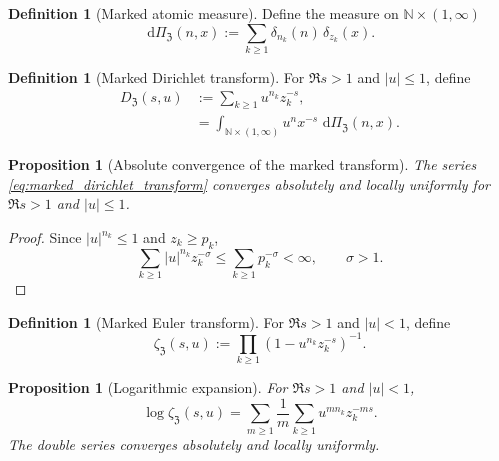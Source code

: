 \documentclass[11pt]{amsart}
\numberwithin{equation}{section}
\theoremstyle{plain}
\newtheorem{proposition}[theorem]{Proposition}
\theoremstyle{definition}
\newtheorem{definition}[theorem]{Definition}
\theoremstyle{remark}
\newcommand{\dd}{\,\mathrm d}
\newcommand{\ZP}{\mathfrak Z}
\newcommand{\N}{\mathbb N}
\begin{document}
\begin{definition}[Marked atomic measure]
\label{def:marked_atomic_measure}
Define the measure on $\N\times(1,\infty)$
\begin{equation}
 \dd\Pi_{\ZP}(n,x)
 :=\sum_{k\geq1}\delta_{n_k}(n)\,\delta_{z_k}(x).
 \label{eq:marked_atomic_measure}
\end{equation}
\end{definition}

\begin{definition}[Marked Dirichlet transform]
\label{def:marked_dirichlet_transform}
For $\Re s>1$ and $|u|\leq1$, define
\begin{align}
 D_{\ZP}(s,u)
 &:=\sum_{k\geq1}u^{n_k}z_k^{-s},
 \label{eq:marked_dirichlet_transform}
 \\
 &=\int_{\N\times(1,\infty)}u^n x^{-s}\,\dd\Pi_{\ZP}(n,x).
 \label{eq:marked_dirichlet_transform_integral}
\end{align}
\end{definition}

\begin{proposition}[Absolute convergence of the marked transform]
\label{prop:marked_transform_convergence}
The series \eqref{eq:marked_dirichlet_transform} converges absolutely and
locally uniformly for $\Re s>1$ and $|u|\leq1$.
\end{proposition}

\begin{proof}
Since $|u|^{n_k}\leq1$ and $z_k\geq p_k$,
\begin{equation}
 \sum_{k\geq1}|u|^{n_k}z_k^{-\sigma}
 \leq\sum_{k\geq1}p_k^{-\sigma}<\infty,
 \qquad \sigma>1.
 \label{eq:marked_transform_majorant}
\end{equation}
\end{proof}

\begin{definition}[Marked Euler transform]
\label{def:marked_euler_transform}
For $\Re s>1$ and $|u|<1$, define
\begin{equation}
 \zeta_{\ZP}(s,u)
 :=\prod_{k\geq1}\left(1-u^{n_k}z_k^{-s}\right)^{-1}.
 \label{eq:marked_euler_transform}
\end{equation}
\end{definition}

\begin{proposition}[Logarithmic expansion]
\label{prop:marked_logarithmic_expansion}
For $\Re s>1$ and $|u|<1$,
\begin{equation}
 \log\zeta_{\ZP}(s,u)
 =\sum_{m\geq1}\frac1m
 \sum_{k\geq1}u^{mn_k}z_k^{-ms}.
 \label{eq:marked_logarithmic_expansion}
\end{equation}
The double series converges absolutely and locally uniformly.
\end{proposition}
\end{document}
